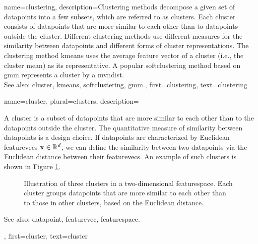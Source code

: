 	
{name={clustering}, 
	description={Clustering methods decompose a given set 
	 of \glspl{datapoint} into a few subsets, which are referred to as \glspl{cluster}. 
	 Each \gls{cluster} consists of \glspl{datapoint} that are more similar to each 
	 other than to \glspl{datapoint} outside the \gls{cluster}. Different clustering methods 
		use different measures for the similarity between \glspl{datapoint} and different 
		forms of \gls{cluster} representations. The clustering method \gls{kmeans} uses the 
		average \gls{feature} vector of a \gls{cluster} (i.e., the \gls{cluster} \gls{mean}) as its representative. 
		A popular \gls{softclustering} method based on \gls{gmm} represents 
		a \gls{cluster} by a \gls{mvndist}.
				\\
		See also:  \gls{cluster}, \gls{kmeans}, \gls{softclustering}, \gls{gmm}.},
		first={clustering},
		text={clustering} }
	
{name={cluster}, 
 plural={clusters}, 
description={A cluster is a subset of 
		\glspl{datapoint} that are more similar to each other than to the \glspl{datapoint} outside the cluster. 
		The quantitative measure of similarity between \glspl{datapoint} is a design choice. If \glspl{datapoint} 
		are characterized by Euclidean \glspl{featurevec} ${\bf x} \in \mathbb{R}^{d}$, 
		we can define the similarity between two \glspl{datapoint} via the Euclidean distance between 
		their \glspl{featurevec}. An example of such clusters is shown in Figure \ref{fig:clusters_dict}.\\
		\begin{figure}[H]
		\centering
		\caption{Illustration of three clusters in a two-dimensional \gls{featurespace}. Each cluster groups \glspl{datapoint} that are more similar to each other than to those in other clusters, based on the Euclidean distance.}
		\label{fig:clusters_dict}
		\end{figure}
		See also: \gls{datapoint}, \gls{featurevec}, \gls{featurespace}.
		},
		first={cluster},
		text={cluster} 
		}


